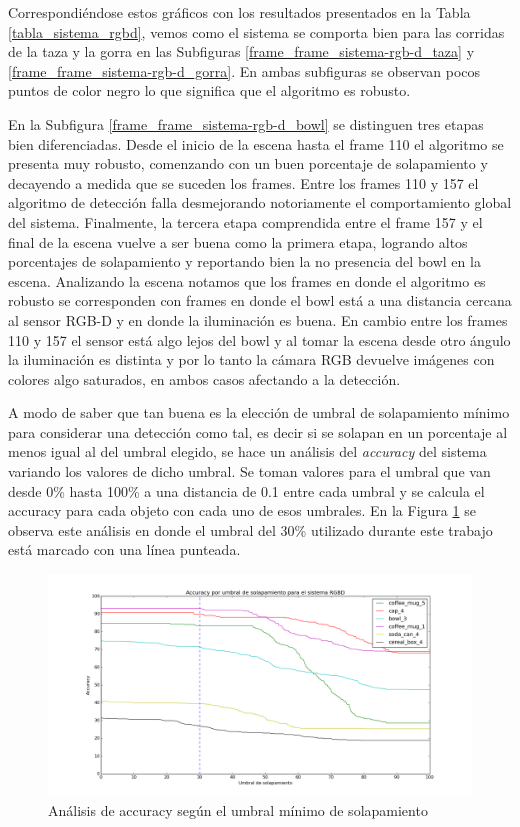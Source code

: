 Correspondiéndose estos gráficos con los resultados presentados en la Tabla \ref{tabla_sistema_rgbd}, vemos como el sistema se comporta bien para las corridas de la taza y la gorra en las Subfiguras \ref{frame_frame_sistema-rgb-d_taza} y \ref{frame_frame_sistema-rgb-d_gorra}. En ambas subfiguras se observan pocos puntos de color negro lo que significa que el algoritmo es robusto.

En la Subfigura \ref{frame_frame_sistema-rgb-d_bowl} se distinguen tres etapas bien diferenciadas. Desde el inicio de la escena hasta el frame 110 el algoritmo se presenta muy robusto, comenzando con un buen porcentaje de solapamiento y decayendo a medida que se suceden los frames. Entre los frames 110 y 157 el algoritmo de detección falla desmejorando notoriamente el comportamiento global del sistema. Finalmente, la tercera etapa comprendida entre el frame 157 y el final de la escena vuelve a ser buena como la primera etapa, logrando altos porcentajes de solapamiento y reportando bien la no presencia del bowl en la escena. Analizando la escena notamos que los frames en donde el algoritmo es robusto se corresponden con frames en donde el bowl está a una distancia cercana al sensor RGB-D y en donde la iluminación es buena. En cambio entre los frames 110 y 157 el sensor está algo lejos del bowl y al tomar la escena desde otro ángulo la iluminación es distinta y por lo tanto la cámara RGB devuelve imágenes con colores algo saturados, en ambos casos afectando a la detección.

A modo de saber que tan buena es la elección de umbral de solapamiento mínimo para considerar una detección como tal, es decir si se solapan en un porcentaje al menos igual al del umbral elegido, se hace un análisis del \textit{accuracy} del sistema variando los valores de dicho umbral. Se toman valores para el umbral que van desde 0\% hasta 100\% a una distancia de 0.1 entre cada umbral y se calcula el accuracy para cada objeto con cada uno de esos umbrales. En la Figura \ref{fig:accuracy_sistema} se observa este análisis en donde el umbral del 30\% utilizado durante este trabajo está marcado con una línea punteada.

\begin{figure}
	\centering
	\includegraphics[width=\textwidth]{img/accuracy_sistemaRGBD.png}
	\caption{Análisis de accuracy según el umbral mínimo de solapamiento}
	\label{fig:accuracy_sistema}
\end{figure}

